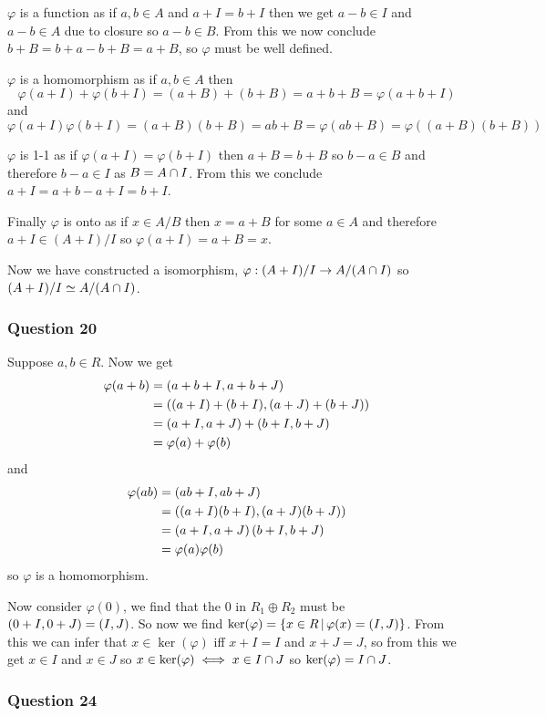 \documentclass{article}
\begin{document}
$\varphi$ is a function as if $a,b\in A$ and $a+I = b+I$ then we get $a-b \in I$ and $a-b \in A$ due to closure so $a-b \in B$. From this we now conclude $b+B = b+a-b+B = a+B$, so $\varphi$ must be well defined.

$\varphi$ is a homomorphism as if $a,b \in A$ then $$\varphi(a+I)+\varphi(b+I) = (a+B)+(b+B) = a + b + B = \varphi(a+b + I)$$ and $$\varphi(a+I)\varphi(b+I) = (a+B)(b+B) = ab+B = \varphi(ab+B) = \varphi((a+B)(b+B))$$

$\varphi$ is 1-1 as if $\varphi(a+I) = \varphi(b+I)$ then $a+B = b+B$ so $b-a\in B$ and therefore $b-a \in I$ as $B = A\cap I$. From this we conclude $a+I=a+b-a+I = b+I$.

Finally $\varphi$ is onto as if $x \in A/B$ then $x = a + B$ for some $a \in A$ and therefore $a + I\in (A+I)/I$ so $\varphi(a+I) = a+B = x$.

Now we have constructed a isomorphism, $\varphi:(A+I)/I \to A/(A\cap I)$ so $(A+I)/I\simeq A/(A\cap I)$.

\subsubsection{Question 20}
Suppose $a,b \in R$. Now we get 
\begin{align*}\varphi(a+b) &= \left( {a+b+I} , {a+b+J} \right)\\& = \left( {(a+I)+(b+I)} , {(a+J)+(b+J)} \right)\\& = \left( {a+I} , {a+J} \right)+\left( {b+I} , {b+J} \right) \\&= \varphi(a)+\varphi(b)\end{align*}
and
\begin{align*}
\varphi(ab)&= \left( {ab+I} , {ab+J} \right)\\
&= \left( {(a+I)(b+I)} , {(a+J)(b+J)} \right) \\
&= \left( {a+I} , {a+J} \right)\left( {b+I} , {b+J} \right) \\
&= \varphi(a)\varphi(b)
\end{align*}
so $\varphi$ is a homomorphism.

Now consider $\varphi(0)$, we find that the 0 in $R_1\oplus R_2$ must be $\left( {0+I} , {0+J} \right) = \left( {I} , {J} \right)$. So now we find $\ker(\varphi) = \left\{{x\in R} \,\middle|\, {\varphi(x) = \left( {I} , {J} \right)}\right\}$. From this we can infer that $x\in \ker(\varphi)$ iff $x +I = I$ and $x + J = J$, so from this we get $x\in I$ and $x\in J$ so $x\in\ker(\varphi) \iff x \in I\cap J$ so $\ker(\varphi) = I\cap J$.


\subsubsection{Question 24}
\end{document}
